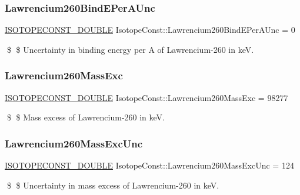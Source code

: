 \subsubsection{\texorpdfstring{Lawrencium260\+Bind\+E\+Per\+A\+Unc}{Lawrencium260BindEPerAUnc}}
{\footnotesize\ttfamily \mbox{\hyperlink{group___isotope_const-_macros_ga8f45a7272ce02c0b4c65c44636ed719a}{I\+S\+O\+T\+O\+P\+E\+C\+O\+N\+S\+T\+\_\+\+D\+O\+U\+B\+LE}} Isotope\+Const\+::\+Lawrencium260\+Bind\+E\+Per\+A\+Unc = 0}

\$ \$ Uncertainty in binding energy per A of Lawrencium-\/260 in keV. \mbox{\label{group___isotope_const-_lawrencium-_lr260_gabddc8222963b4bf3935952dcf52ce866}} 
\subsubsection{\texorpdfstring{Lawrencium260\+Mass\+Exc}{Lawrencium260MassExc}}
{\footnotesize\ttfamily \mbox{\hyperlink{group___isotope_const-_macros_ga8f45a7272ce02c0b4c65c44636ed719a}{I\+S\+O\+T\+O\+P\+E\+C\+O\+N\+S\+T\+\_\+\+D\+O\+U\+B\+LE}} Isotope\+Const\+::\+Lawrencium260\+Mass\+Exc = 98277}

\$ \$ Mass excess of Lawrencium-\/260 in keV. \mbox{\label{group___isotope_const-_lawrencium-_lr260_ga9e1c8773ed88042d84b1f57262b6fa31}} 
\subsubsection{\texorpdfstring{Lawrencium260\+Mass\+Exc\+Unc}{Lawrencium260MassExcUnc}}
{\footnotesize\ttfamily \mbox{\hyperlink{group___isotope_const-_macros_ga8f45a7272ce02c0b4c65c44636ed719a}{I\+S\+O\+T\+O\+P\+E\+C\+O\+N\+S\+T\+\_\+\+D\+O\+U\+B\+LE}} Isotope\+Const\+::\+Lawrencium260\+Mass\+Exc\+Unc = 124}

\$ \$ Uncertainty in mass excess of Lawrencium-\/260 in keV. \mbox{\label{group___isotope_const-_lawrencium-_lr260_gab98bfbe6275934728b2b0b0590a2321a}} 
